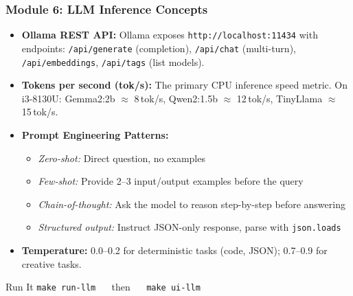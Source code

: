 \begin{frame}[fragile]\frametitle{Module 6: LLM Inference Concepts}
\begin{itemize}
  \item \textbf{Ollama REST API:} Ollama exposes \texttt{http://localhost:11434} with endpoints: \texttt{/api/generate} (completion), \texttt{/api/chat} (multi-turn), \texttt{/api/embeddings}, \texttt{/api/tags} (list models).
  \item \textbf{Tokens per second (tok/s):} The primary CPU inference speed metric. On i3-8130U: Gemma2:2b $\approx$ 8\,tok/s, Qwen2:1.5b $\approx$ 12\,tok/s, TinyLlama $\approx$ 15\,tok/s.
  \item \textbf{Prompt Engineering Patterns:}
  \begin{itemize}
    \item \textit{Zero-shot:} Direct question, no examples
    \item \textit{Few-shot:} Provide 2--3 input/output examples before the query
    \item \textit{Chain-of-thought:} Ask the model to reason step-by-step before answering
    \item \textit{Structured output:} Instruct JSON-only response, parse with \texttt{json.loads}
  \end{itemize}
  \item \textbf{Temperature:} 0.0--0.2 for deterministic tasks (code, JSON); 0.7--0.9 for creative tasks.
\end{itemize}
\begin{block}{Run It}
  \texttt{make run-llm} $\quad$ then $\quad$ \texttt{make ui-llm}
\end{block}
\end{frame}

